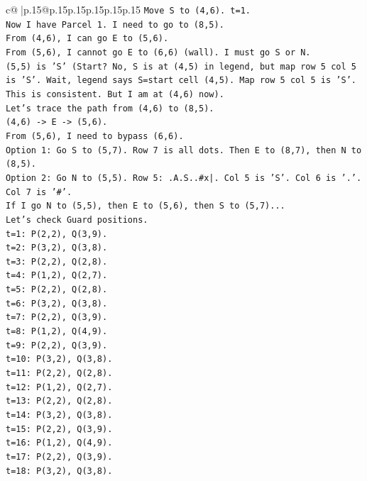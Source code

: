 \documentclass{article}
\begin{document}
{\begin{supertabular}{c@{$\;$}|p{.15\linewidth}@{}p{.15\linewidth}p{.15\linewidth}p{.15\linewidth}p{.15\linewidth}p{.15\linewidth}}
{{{\texttt{Move S to (4,6). t=1.} \\
\texttt{Now I have Parcel 1. I need to go to (8,5).} \\
\texttt{From (4,6), I can go E to (5,6).} \\
\texttt{From (5,6), I cannot go E to (6,6) (wall). I must go S or N.} \\
\texttt{(5,5) is 'S' (Start? No, S is at (4,5) in legend, but map row 5 col 5 is 'S'. Wait, legend says S=start cell (4,5). Map row 5 col 5 is 'S'. This is consistent. But I am at (4,6) now).} \\
\texttt{Let's trace the path from (4,6) to (8,5).} \\
\texttt{(4,6) {-}> E {-}> (5,6).} \\
\texttt{From (5,6), I need to bypass (6,6).} \\
\texttt{Option 1: Go S to (5,7). Row 7 is all dots. Then E to (8,7), then N to (8,5).} \\
\texttt{Option 2: Go N to (5,5). Row 5: .A.S..\#x|. Col 5 is 'S'. Col 6 is '.'. Col 7 is '\#'.} \\
\texttt{If I go N to (5,5), then E to (5,6), then S to (5,7)...} \\
\texttt{Let's check Guard positions.} \\
\texttt{t=1: P(2,2), Q(3,9).} \\
\texttt{t=2: P(3,2), Q(3,8).} \\
\texttt{t=3: P(2,2), Q(2,8).} \\
\texttt{t=4: P(1,2), Q(2,7).} \\
\texttt{t=5: P(2,2), Q(2,8).} \\
\texttt{t=6: P(3,2), Q(3,8).} \\
\texttt{t=7: P(2,2), Q(3,9).} \\
\texttt{t=8: P(1,2), Q(4,9).} \\
\texttt{t=9: P(2,2), Q(3,9).} \\
\texttt{t=10: P(3,2), Q(3,8).} \\
\texttt{t=11: P(2,2), Q(2,8).} \\
\texttt{t=12: P(1,2), Q(2,7).} \\
\texttt{t=13: P(2,2), Q(2,8).} \\
\texttt{t=14: P(3,2), Q(3,8).} \\
\texttt{t=15: P(2,2), Q(3,9).} \\
\texttt{t=16: P(1,2), Q(4,9).} \\
\texttt{t=17: P(2,2), Q(3,9).} \\
\texttt{t=18: P(3,2), Q(3,8).} \\
}}}
\end{supertabular}}
\end{document}
